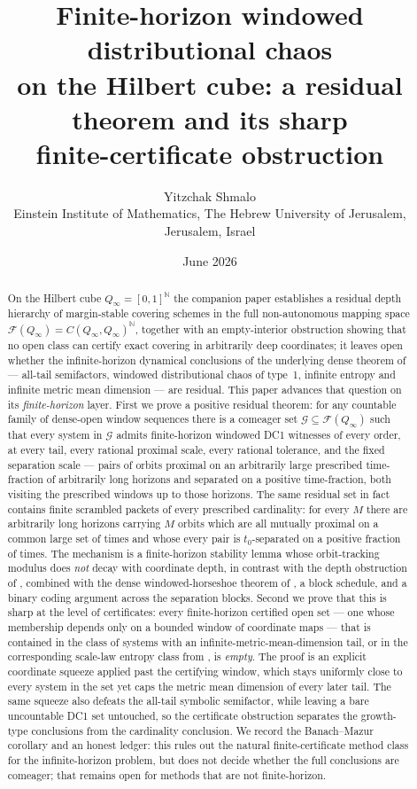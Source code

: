 \documentclass[11pt]{article}
\title{Finite-horizon windowed distributional chaos\\
on the Hilbert cube: a residual theorem and its sharp\\
finite-certificate obstruction}
\author{Yitzchak Shmalo\\
\small Einstein Institute of Mathematics, The Hebrew University of Jerusalem, Jerusalem, Israel\\
\small }
\date{June 2026}
\newcommand{\Q}{Q_\infty}
\newcommand{\F}{\mathcal{F}}
\newcommand{\Gcal}{\mathcal{G}}
\begin{document}
\maketitle

\begin{abstract}
On the Hilbert cube $\Q=[0,1]^{\mathbb N}$ the companion paper \cite{companion}
establishes a residual depth hierarchy of margin-stable covering schemes in the full
non-autonomous mapping space $\F(\Q)=C(\Q,\Q)^{\mathbb N}$, together with an
empty-interior obstruction showing that no open class can certify exact covering in
arbitrarily deep coordinates; it leaves open whether the infinite-horizon dynamical
conclusions of the underlying dense theorem of \cite{Shmalo2026} --- all-tail
semifactors, windowed distributional chaos of type~1, infinite entropy and infinite
metric mean dimension --- are residual.  This paper advances that question on its
\emph{finite-horizon} layer.  First we prove a positive residual theorem: for any
countable family of dense-open window sequences there is a comeager set
$\Gcal\subseteq\F(\Q)$ such that every system in $\Gcal$ admits finite-horizon windowed
DC1 witnesses of every order, at every tail, every rational proximal scale, every
rational tolerance, and the fixed separation scale --- pairs of orbits proximal on an
arbitrarily large prescribed time-fraction of arbitrarily long horizons and separated on
a positive time-fraction, both visiting the prescribed windows up to those horizons.
The same residual set in fact contains finite scrambled packets of every prescribed
cardinality: for every \(M\) there are arbitrarily long horizons carrying \(M\) orbits
which are all mutually proximal on a common large set of times and whose every pair is
\(t_0\)-separated on a positive fraction of times.  The mechanism is a
finite-horizon stability lemma whose orbit-tracking modulus does \emph{not} decay with
coordinate depth, in contrast with the depth obstruction of \cite{companion}, combined
with the dense windowed-horseshoe theorem of \cite{Shmalo2026}, a block schedule, and a
binary coding argument across the separation blocks.
Second we prove that this is sharp at the level of certificates: every finite-horizon
certified open set --- one whose membership depends only on a bounded window of
coordinate maps --- that is contained in the class of systems with an
infinite-metric-mean-dimension tail, or in the corresponding scale-law entropy class from
\cite{Shmalo2026}, is \emph{empty}.  The proof is an explicit coordinate squeeze
applied past the certifying window, which stays uniformly close to every system in the
set yet caps the metric mean dimension of every later tail.  The same squeeze also defeats
the all-tail symbolic semifactor, while leaving a bare uncountable DC1 set untouched, so
the certificate obstruction separates the growth-type conclusions from the cardinality
conclusion.  We record the Banach--Mazur corollary and an honest ledger: this rules out the natural
finite-certificate method class for the infinite-horizon problem, but does not decide
whether the full conclusions are comeager; that remains open for methods that are not
finite-horizon.
\end{abstract}
\end{document}

